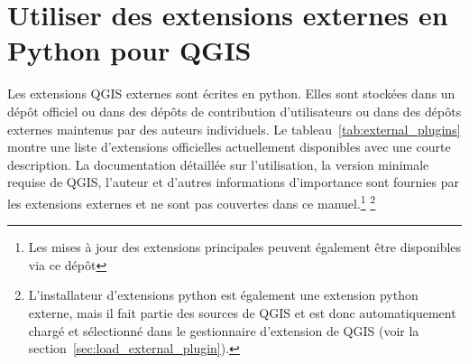 \section{Utiliser des extensions externes en Python pour QGIS}\label{sec:external_plugins}



Les extensions QGIS externes sont écrites en python. Elles sont stockées dans un dépôt officiel ou dans des dépôts de contribution d'utilisateurs ou dans des dépôts externes maintenus par des auteurs individuels. Le tableau~\ref{tab:external_plugins} montre une liste d'extensions officielles actuellement disponibles avec une courte description. La documentation détaillée sur l'utilisation, la version minimale requise de QGIS, l'auteur et d'autres informations d'importance sont fournies par les extensions externes et ne sont pas couvertes dans ce manuel.\footnote{Les mises à jour des extensions principales peuvent également être disponibles via ce dépôt} \footnote{L'installateur d'extensions python est également une extension python externe, mais il fait partie des sources de QGIS et est donc automatiquement chargé et sélectionné dans le gestionnaire d'extension de QGIS (voir la section~\ref{sec:load_external_plugin}).}

